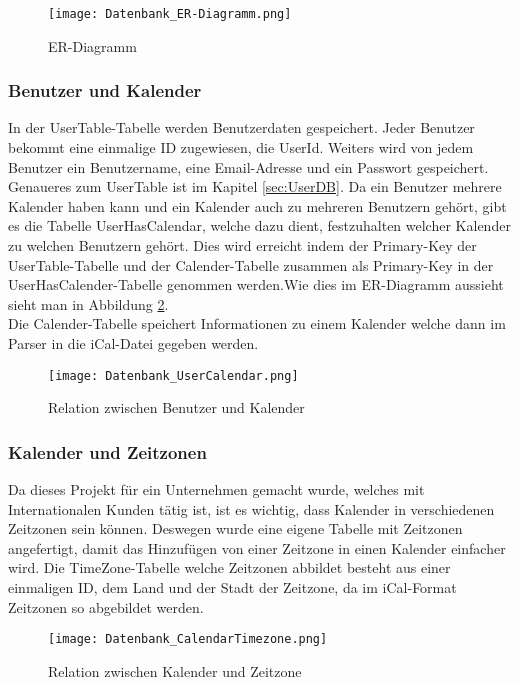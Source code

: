 \begin{figure}[H]
	\texttt{[image: Datenbank\_ER-Diagramm.png]}
    \caption{ER-Diagramm}
    \label{fig:erDiagramm}
\end{figure}

\subsubsection*{Benutzer und Kalender}
\label{ref:benutzerKalender}
In der UserTable-Tabelle werden Benutzerdaten gespeichert. Jeder Benutzer bekommt eine einmalige ID zugewiesen, die UserId. Weiters wird von jedem Benutzer ein Benutzername, eine Email-Adresse und ein Passwort gespeichert. Genaueres zum UserTable ist im Kapitel \ref{sec:UserDB}. Da ein Benutzer mehrere Kalender haben kann und ein Kalender auch zu mehreren Benutzern gehört, gibt es die Tabelle UserHasCalendar, welche dazu dient, festzuhalten welcher Kalender zu welchen Benutzern gehört. Dies wird erreicht indem der Primary-Key der UserTable-Tabelle und der Calender-Tabelle zusammen als Primary-Key in der UserHasCalender-Tabelle genommen werden.Wie dies im ER-Diagramm aussieht sieht man in Abbildung \ref{fig:userCalender}.\\
Die Calender-Tabelle speichert Informationen zu einem Kalender welche dann im Parser in die iCal-Datei gegeben werden.
\begin{figure}[H]
	\texttt{[image: Datenbank\_UserCalendar.png]}
    \caption{Relation zwischen Benutzer und Kalender}
    \label{fig:userCalender}
\end{figure}

\subsubsection*{Kalender und Zeitzonen}
\label{ref:kalenderZeitzonen}
Da dieses Projekt für ein Unternehmen gemacht wurde, welches mit Internationalen Kunden tätig ist, ist es wichtig, dass Kalender in verschiedenen Zeitzonen sein können. Deswegen wurde eine eigene Tabelle mit Zeitzonen angefertigt, damit das Hinzufügen von einer Zeitzone in einen Kalender einfacher wird. Die TimeZone-Tabelle welche Zeitzonen abbildet besteht aus einer einmaligen ID, dem Land und der Stadt der Zeitzone, da im iCal-Format Zeitzonen so abgebildet werden. 
\begin{figure}[H]
	\texttt{[image: Datenbank\_CalendarTimezone.png]}
    \caption{Relation zwischen Kalender und Zeitzone}
    \label{fig:timezoneCalender}
\end{figure}

